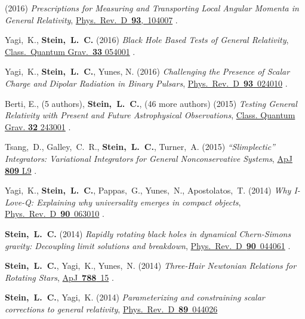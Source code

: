 \begin{etaremune}[start=\value{pubCounter}]
  (2016)
  {\it Prescriptions for Measuring and Transporting Local Angular
    Momenta in General Relativity},
  \href{http://dx.doi.org/10.1103/PhysRevD.93.104007}{Phys.~Rev.~D~{\bf 93},~104007}
  .
\item
  Yagi,~K., {\bf Stein,~L.~C.}
  (2016)
  {\it Black Hole Based Tests of General Relativity},
  \href{http://dx.doi.org/10.1088/0264-9381/33/5/054001}{Class.~Quantum Grav.~{\bf 33} 054001}
  .
\item
  Yagi,~K., {\bf Stein,~L.~C.}, Yunes, N.
  (2016)
  {\it Challenging the Presence of Scalar Charge and Dipolar Radiation
    in Binary Pulsars},
  \href{http://dx.doi.org/doi:10.1103/PhysRevD.93.024010}{Phys.~Rev.~D~{\bf 93}~024010}
  .
\item
  Berti, E., (5 authors), {\bf Stein,~L.~C.}, (46 more authors)
  (2015)
  {\it Testing General Relativity with Present and Future
    Astrophysical Observations},
  \href{http://dx.doi.org/10.1088/0264-9381/32/24/243001}{Class. Quantum Grav. {\bf 32} 243001}
  .
\item
  Tsang,~D., Galley,~C.~R., {\bf Stein,~L.~C.}, Turner,~A.
  (2015)
  {\it ``Slimplectic'' Integrators: Variational Integrators for General Nonconservative Systems},
  \href{http://dx.doi.org/10.1088/2041-8205/809/1/L9}{ApJ {\bf 809} L9}
  .
\item
  Yagi,~K., {\bf Stein,~L.~C.}, Pappas,~G., Yunes,~N., Apostolatos,~T.
  (2014)
  {\it Why I-Love-Q: Explaining why universality emerges in compact objects},
  \href{http://dx.doi.org/10.1103/PhysRevD.90.063010}{Phys.~Rev.~D~{\bf 90}~063010}
  .
\item
  {\bf Stein,~L.~C.}
  (2014)
  {\it Rapidly rotating black holes in dynamical Chern-Simons gravity:
    Decoupling limit solutions and breakdown},
  \href{http://dx.doi.org/10.1103/PhysRevD.90.044061}{Phys.~Rev.~D~{\bf 90}~044061}
  .
\item
  {\bf Stein,~L.~C.}, Yagi,~K., Yunes,~N.
  (2014)
  {\it Three-Hair Newtonian Relations for Rotating Stars},
  \href{http://dx.doi.org/10.1088/0004-637X/788/1/15}{ApJ~{\bf 788}~15}
  .
\item
  {\bf Stein,~L.~C.}, Yagi,~K.
  (2014)
  {\it Parameterizing and constraining scalar corrections to general relativity},
  \href{http://dx.doi.org/10.1103/PhysRevD.89.044026}{Phys.~Rev.~D~{\bf 89}~044026}

\end{etaremune}
